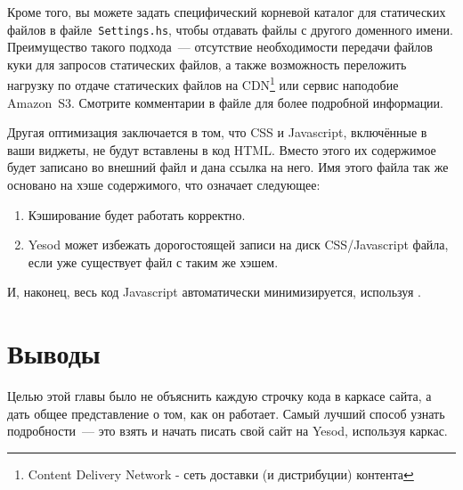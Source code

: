 Кроме того, вы можете задать специфический корневой каталог для статических
файлов в файле~\texttt{Settings.hs}, чтобы отдавать файлы с другого доменного
имени. Преимущество такого подхода~--- отсутствие необходимости передачи файлов
куки для запросов статических файлов, а также возможность переложить нагрузку по
отдаче статических файлов на CDN\footnote{Content Delivery Network - сеть
    доставки (и дистрибуции) контента} или сервис наподобие Amazon~S3.
Смотрите комментарии в файле для более подробной информации.

Другая оптимизация заключается в том, что CSS и Javascript, включённые в ваши
виджеты, не будут вставлены в код HTML. Вместо этого их содержимое будет записано
во внешний файл и дана ссылка на него.  Имя этого файла так же основано на
хэше содержимого, что означает следующее:
\begin{enumerate}
  \item Кэширование будет работать корректно.
  \item Yesod может избежать дорогостоящей записи на диск CSS/Javascript файла,
      если уже существует файл с таким же хэшем.
\end{enumerate}

И, наконец, весь код Javascript автоматически минимизируется, используя .

\section{Выводы}
Целью этой главы было не объяснить каждую строчку кода в каркасе сайта, а
дать общее представление о том, как он работает.  Самый лучший способ
узнать подробности~--- это взять и начать писать свой сайт на Yesod,
используя каркас.
